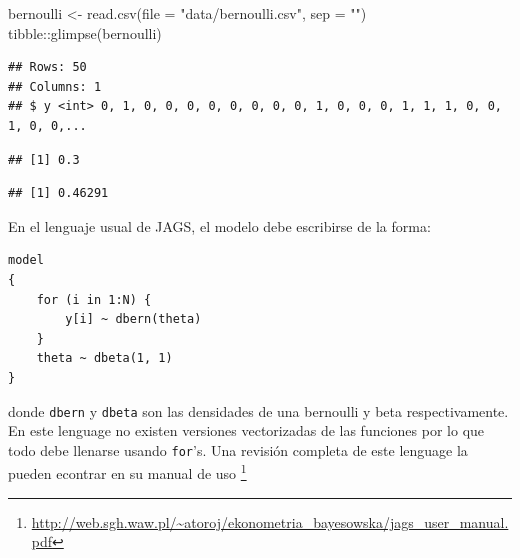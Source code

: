 \documentclass[
  12pt,
]{book}
\newenvironment{Shaded}{\begin{snugshade}}{\end{snugshade}}
\newcommand{\AttributeTok}[1]{\textcolor[rgb]{0.77,0.63,0.00}{#1}}
\newcommand{\FunctionTok}[1]{\textcolor[rgb]{0.00,0.00,0.00}{#1}}
\newcommand{\NormalTok}[1]{#1}
\newcommand{\OtherTok}[1]{\textcolor[rgb]{0.56,0.35,0.01}{#1}}
\newcommand{\SpecialCharTok}[1]{\textcolor[rgb]{0.00,0.00,0.00}{#1}}
\newcommand{\StringTok}[1]{\textcolor[rgb]{0.31,0.60,0.02}{#1}}
\theoremstyle{definition}
\theoremstyle{definition}
\theoremstyle{definition}
\theoremstyle{remark}
\begin{document}
\begin{Shaded}
\begin{Highlighting}[]
\NormalTok{bernoulli }\OtherTok{\textless{}{-}} \FunctionTok{read.csv}\NormalTok{(}\AttributeTok{file =} \StringTok{"data/bernoulli.csv"}\NormalTok{, }
    \AttributeTok{sep =} \StringTok{""}\NormalTok{)}
\NormalTok{tibble}\SpecialCharTok{::}\FunctionTok{glimpse}\NormalTok{(bernoulli)}
\end{Highlighting}
\end{Shaded}

\begin{verbatim}
## Rows: 50
## Columns: 1
## $ y <int> 0, 1, 0, 0, 0, 0, 0, 0, 0, 0, 1, 0, 0, 0, 1, 1, 1, 0, 0, 1, 0, 0,...
\end{verbatim}

\begin{Shaded}
\end{Shaded}

\begin{verbatim}
## [1] 0.3
\end{verbatim}

\begin{Shaded}
\end{Shaded}

\begin{verbatim}
## [1] 0.46291
\end{verbatim}

En el lenguaje usual de JAGS, el modelo debe escribirse de la forma:

\begin{verbatim}
model
{
    for (i in 1:N) {
        y[i] ~ dbern(theta)
    }
    theta ~ dbeta(1, 1)
}
\end{verbatim}

donde \texttt{dbern} y \texttt{dbeta} son las densidades de una bernoulli y beta respectivamente. En este lenguage no existen versiones vectorizadas de las funciones por lo que todo debe llenarse usando \texttt{for}'s. Una revisión completa de este lenguage la pueden econtrar en su manual de uso \footnote{\url{http://web.sgh.waw.pl/~atoroj/ekonometria_bayesowska/jags_user_manual.pdf}}
\end{document}

